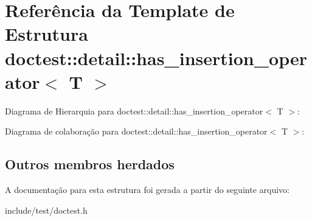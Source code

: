 \hypertarget{structdoctest_1_1detail_1_1has__insertion__operator}{}\section{Referência da Template de Estrutura doctest\+:\+:detail\+:\+:has\+\_\+insertion\+\_\+operator$<$ T $>$}
\label{structdoctest_1_1detail_1_1has__insertion__operator}


Diagrama de Hierarquia para doctest\+:\+:detail\+:\+:has\+\_\+insertion\+\_\+operator$<$ T $>$\+:


Diagrama de colaboração para doctest\+:\+:detail\+:\+:has\+\_\+insertion\+\_\+operator$<$ T $>$\+:
\subsection*{Outros membros herdados}


A documentação para esta estrutura foi gerada a partir do seguinte arquivo\+:\begin{DoxyCompactItemize}
\item 
include/test/doctest.\+h\end{DoxyCompactItemize}
